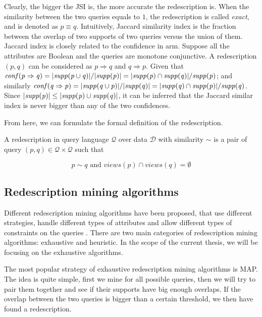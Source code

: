 Clearly, the bigger the \acl{JSI} is, the more accurate the redescription is.
When the similarity between the two queries equals to $1$, the redescription is called \textit{exact}, and is denoted as $p \equiv q$.
Intuitively, Jaccard similarity index is the fraction between the overlap of two supports of two queries versus the union of them.
Jaccard index is closely related to the confidence in \acl{arm}.
Suppose all the attributes are Boolean and the queries are monotone conjunctive.
A redescription $\left(p,q\right)$ can be considered as $p \Rightarrow q$ and $q \Rightarrow p$.
Given that $\mathit{conf({p} \Rightarrow {q})}=\lvert \mathit{supp({p \cup q})} \rvert/\lvert \mathit{supp({p})} \rvert=\lvert \mathit{supp({p})} \cap \mathit{supp({q})}\rvert/\mathit{supp({p})}$;
and similarly $\mathit{conf({q} \Rightarrow {p})}=\lvert \mathit{supp({q \cup p})} \rvert/\lvert \mathit{supp({q})} \rvert=\lvert \mathit{supp({q})} \cap \mathit{supp({p})}\rvert/\mathit{supp({q})}$.
Since $\lvert \mathit{supp({p})} \rvert\leq \lvert\mathit{supp({p})}\cup \mathit{supp({q})}\rvert$, it can be inferred that the Jaccard similar index is never bigger than any of the two confidences.

From here, we can formulate the formal definition of the redescription.

\begin{definition}
    A redescription in query language $\mathcal{Q}$ over data $\mathcal{D}$ with similarity $\sim$ is a pair of query $(p, q) \in \mathcal{Q} \times \mathcal{Q}$ such that

    \begin{equation}
        p \sim q \text{ and } views(p) \cap views(q) = \emptyset
    \end{equation}
\end{definition}

\subsection{Redescription mining algorithms}
Different redescription mining algorithms have been proposed, that use different strategies, handle different types of attributes and allow different types of constraints on the queries \cite{galbrun2018redescription}.
There are two main categories of redescription mining algorithms: exhaustive and heuristic.
In the scope of the current thesis, we will be focusing on the exhaustive algorithms.

The most popular strategy of exhaustive redescription mining algorithms is \ac{MAP}.
The idea is quite simple, first we mine for all possible queries, then we will try to pair them together and see if their supports have big enough overlaps.
If the overlap between the two queries is bigger than a certain threshold, we then have found a redescription.

